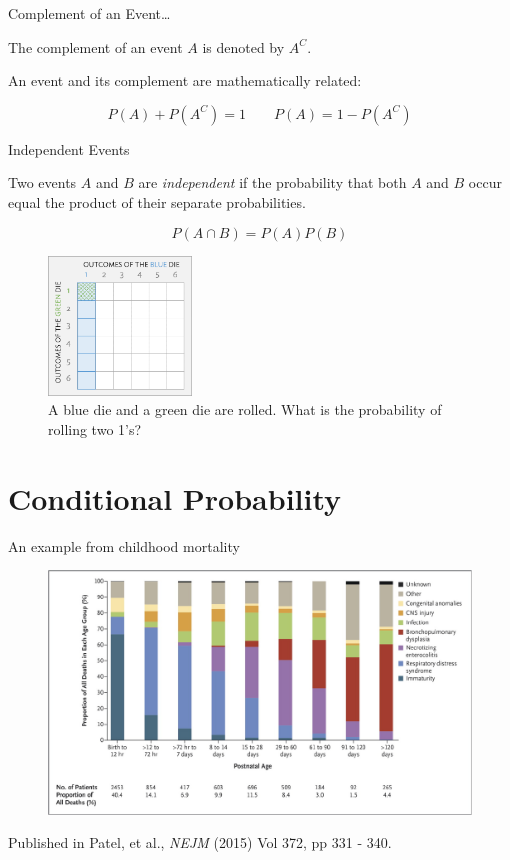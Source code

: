 \documentclass[ignorenonframetext,aspectratio=169]{beamer}
\begin{document}
\begin{frame}{Complement of an Event\ldots{}}

The complement of an event \(A\) is denoted by \(A^C\).

An event and its complement are mathematically related:

\[P(A) + P(A^C) = 1 \qquad P(A) = 1 - P(A^C)\]

\end{frame}

\begin{frame}{Independent Events}

Two events \(A\) and \(B\) are \emph{independent} if the probability
that both \(A\) and \(B\) occur equal the product of their separate
probabilities.

\[P(A \cap B) = P(A)P(B) \]

\begin{center}
\begin{figure}
\includegraphics[width=1.5in]{figures/indepForRollingTwo1s.png}
\caption{A blue die and a green die are rolled. What is the probability of rolling two 1's?}
\end{figure}
\end{center}

\end{frame}

\section{Conditional Probability}\label{conditional-probability}

\begin{frame}{An example from childhood mortality}

\begin{center}
\begin{figure}
\includegraphics[width=4.5in]{figures/premature_infant_death}
\end{figure}
\end{center}

\footnotesize

Published in Patel, et al., \emph{NEJM} (2015) Vol 372, pp 331 - 340.

\end{frame}
\end{document}
